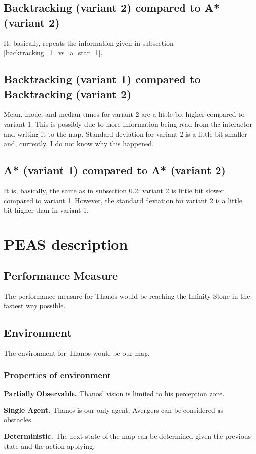 \documentclass{article}
\begin{document}
\subsection{Backtracking (variant 2) compared to A* (variant 2)}
It, basically, repeats the information given in subsection \ref{backtracking_1_vs_a_star_1}.
\subsection{Backtracking (variant 1) compared to Backtracking (variant 2)} \label{backtracking_1_vs_backtracking_2}
Mean, mode, and median times for variant 2 are a little bit higher compared to variant 1. This is possibly due to more information being read from the interactor and writing it to the map.
Standard deviation for variant 2 is a little bit smaller and, currently, I do not know why this happened.
\subsection{A* (variant 1) compared to A* (variant 2)}
It is, basically, the same as in subsection \ref{backtracking_1_vs_backtracking_2}: variant 2 is little bit slower compared to variant 1. However, the standard deviation for variant 2 is a little bit higher than in variant 1.
\section{PEAS description}
\subsection{Performance Measure}
The performance measure for Thanos would be reaching the Infinity Stone in the fastest way possible.
\subsection{Environment}
The environment for Thanos would be our map.
\subsubsection{Properties of environment}
\textbf{Partially Observable.} Thanos' vision is limited to his perception zone.

\textbf{Single Agent.} Thanos is our only agent. Avengers can be considered as obstacles.

\textbf{Deterministic.} The next state of the map can be determined given the previous state and the action applying.
\end{document}
